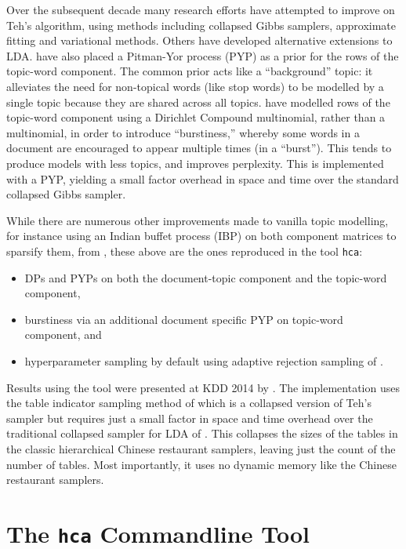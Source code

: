 \documentclass[twoside,11pt]{article}
\begin{document}
Over the subsequent decade many
research efforts have attempted to improve on Teh's algorithm,
using methods including collapsed Gibbs
samplers, approximate fitting and variational methods.
Others have developed alternative extensions to LDA.
\cite{Sato:2010} have also placed a Pitman-Yor process (PYP) as a prior
for the rows of the topic-word component.
The common prior acts like a ``background'' topic: it alleviates the need
for non-topical words (like stop words)
to be modelled by a single topic because they are
shared across all topics.
\cite{Doyle:2009} have modelled rows of the topic-word component using
a Dirichlet Compound multinomial, rather than a multinomial,
in order to introduce ``burstiness,'' whereby some words in
a document are encouraged to appear multiple times (in a ``burst'').
This tends to produce models with less topics,
and  improves perplexity.
This is implemented with a PYP, yielding a small factor overhead
in space and time over the standard collapsed Gibbs sampler.

While there are numerous other improvements made to vanilla topic
modelling,
for instance using an Indian buffet process (IBP) on both
component matrices to sparsify them, from \cite{archambeau2015latent},
these above are the ones reproduced in the tool {\tt hca}:
\begin{itemize}
\item
  DPs and PYPs on both
  the document-topic component and the topic-word component,
\item
  burstiness via an additional document specific PYP on
  topic-word component, and
\item
  hyperparameter sampling
  by default using adaptive rejection sampling of
  \cite{gilks1992adaptive}.
\end{itemize}
Results using the tool were presented at KDD 2014 by
\cite{buntinemishra14}.
The implementation uses the table indicator sampling method of
\cite{chen2011sampling} which is a collapsed version of
Teh's sampler but requires just a small factor in
space and time overhead over the traditional
collapsed sampler for LDA of \cite{griffiths2004finding}.
This collapses the sizes of the tables in the classic
hierarchical Chinese restaurant samplers, leaving just the
count of the number of tables.
Most importantly, it uses no dynamic memory like the Chinese restaurant
samplers.

\section{The {\tt hca} Commandline Tool}
\end{document}
